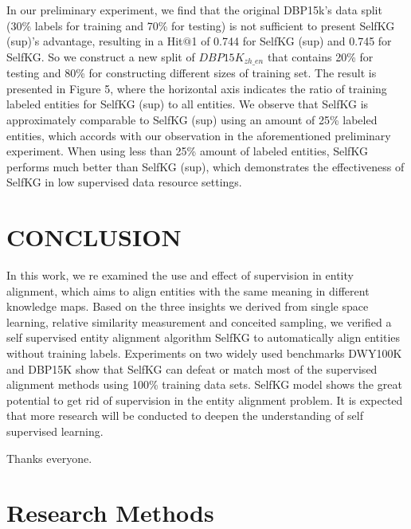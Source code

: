 \documentclass[sigconf]{acmart}
\begin{document}
{In our preliminary experiment, we find that the original DBP15k’s data split (30\% labels for training and 70\% for testing) is not sufficient to present SelfKG (sup)’s advantage, resulting in a Hit$@$1 of 0.744 for SelfKG (sup) and 0.745 for SelfKG. So we construct a new split of $DBP15K_{zh\_en}$ that contains 20\% for testing and 80\% for constructing different sizes of training set. The result is presented in Figure 5, where the horizontal axis indicates the ratio of training labeled entities for SelfKG (sup) to all entities. We observe that SelfKG is approximately comparable to SelfKG (sup) using an amount of 25\% labeled entities, which accords with our observation in the aforementioned preliminary experiment. When using less than 25\% amount of labeled entities, SelfKG performs much better than SelfKG (sup), which demonstrates the effectiveness of SelfKG in low supervised data resource settings.

\section{CONCLUSION}

In this work, we re examined the use and effect of supervision in entity alignment, which aims to align entities with the same meaning in different knowledge maps. Based on the three insights we derived from single space learning, relative similarity measurement and conceited sampling, we verified a self supervised entity alignment algorithm SelfKG to automatically align entities without training labels. Experiments on two widely used benchmarks DWY100K and DBP15K show that SelfKG can defeat or match most of the supervised alignment methods using 100\% training data sets. SelfKG model shows the great potential to get rid of supervision in the entity alignment problem. It is expected that more research will be conducted to deepen the understanding of self supervised learning.

\begin{acks}
Thanks everyone.
\end{acks}




\appendix


\section{Research Methods}

}
\end{document}
